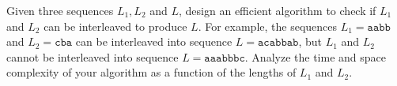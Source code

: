 \problem{}
Given three sequences $L_1, L_2$ and $L$, design an efficient algorithm to check if $L_1$ and $L_2$ can be interleaved to produce $L$.  For example, the sequences $L_1 = \texttt{aabb}$ and $L_2 = \texttt{cba}$ can be interleaved into sequence $L = \texttt{acabbab}$, but $L_1$ and $L_2$ cannot be interleaved into sequence $L = \texttt{aaabbbc}$.  Analyze the time and space complexity of your algorithm as a function of the lengths of $L_1$ and $L_2$.

\solution{}

\newpage